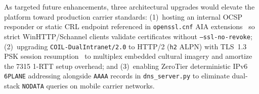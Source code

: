 As targeted future enhancements, three architectural upgrades would elevate the platform toward production carrier standards: (1)~hosting an internal OCSP responder or static CRL endpoint referenced in \nolinkurl{openssl.cnf} AIA extensions~\cite{rfc5280} so strict WinHTTP/Schannel clients validate certificates without \texttt{--ssl-no-revoke}; (2)~upgrading \texttt{COIL-DualIntranet/2.0} to HTTP/2 (\texttt{h2} ALPN) with TLS~1.3 PSK session resumption~\cite{rfc8446,rfc9110} to multiplex embedded cultural imagery and amortize the \qty{7315}{\byte} 1-RTT setup overhead; and (3)~enabling ZeroTier deterministic IPv6 \texttt{6PLANE} addressing alongside \texttt{AAAA} records in \texttt{dns\_server.py} to eliminate dual-stack \texttt{NODATA} queries on mobile carrier networks.
